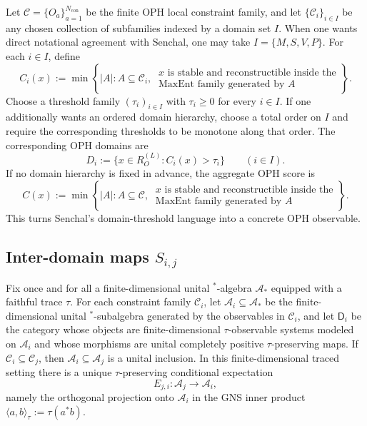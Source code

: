 \documentclass[11pt]{article}
\theoremstyle{remark}
\theoremstyle{plain}
\begin{document}
Let \(\mathcal C=\{O_a\}_{a=1}^{N_{\mathrm{con}}}\) be the finite OPH local constraint family, and let \(\{\mathcal C_i\}_{i\in I}\) be any chosen collection of subfamilies indexed by a domain set \(I\). When one wants direct notational agreement with Senchal, one may take \(I=\{M,S,V,P\}\). For each \(i\in I\), define
\[
C_i(x)
:=
\min\left\{
|A|:
A\subseteq\mathcal C_i,\
\begin{array}{l}
x\text{ is stable and reconstructible inside the}\\
\text{MaxEnt family generated by }A
\end{array}
\right\}.
\]
Choose a threshold family \((\tau_i)_{i\in I}\) with \(\tau_i\ge 0\) for every \(i\in I\). If one additionally wants an ordered domain hierarchy, choose a total order on \(I\) and require the corresponding thresholds to be monotone along that order. The corresponding OPH domains are
\[
D_i:=\{x\in R_O^{(L)}: C_i(x)>\tau_i\}
\qquad (i\in I).
\]
If no domain hierarchy is fixed in advance, the aggregate OPH score is
\[
C(x):=
\min\left\{
|A|:
A\subseteq\mathcal C,\
\begin{array}{l}
x\text{ is stable and reconstructible inside the}\\
\text{MaxEnt family generated by }A
\end{array}
\right\}.
\]
This turns Senchal's domain-threshold language into a concrete OPH observable.

\subsection{Inter-domain maps \(S_{i,j}\)}

Fix once and for all a finite-dimensional unital \(^*\)-algebra \(\mathcal A_\ast\) equipped with a faithful trace \(\tau\). For each constraint family \(\mathcal C_i\), let \(\mathcal A_i\subseteq \mathcal A_\ast\) be the finite-dimensional unital \(^*\)-subalgebra generated by the observables in \(\mathcal C_i\), and let \(\mathsf D_i\) be the category whose objects are finite-dimensional \(\tau\)-observable systems modeled on \(\mathcal A_i\) and whose morphisms are unital completely positive \(\tau\)-preserving maps. If \(\mathcal C_i\subseteq \mathcal C_j\), then \(\mathcal A_i\subseteq \mathcal A_j\) is a unital inclusion. In this finite-dimensional traced setting there is a unique \(\tau\)-preserving conditional expectation
\[
E_{j,i}:\mathcal A_j\to \mathcal A_i,
\]
namely the orthogonal projection onto \(\mathcal A_i\) in the GNS inner product \(\langle a,b\rangle_\tau:=\tau(a^\ast b)\).
\end{document}
